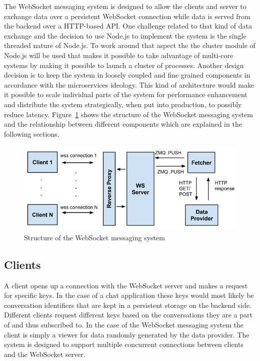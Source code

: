 The WebSocket messaging system is designed to allow the clients and server to exchange data over a persistent WebSocket connection while data is served from the backend over a HTTP-based API. One challenge related to that kind of data exchange and the decision to use Node.js to implement the system is the single threaded nature of Node.js. To work around that aspect the the cluster module of Node.js will be used that makes it possible to take advantage of multi-core systems by making it possible to launch a cluster of processes. Another design decision is to keep the system in loosely coupled and fine grained components in accordance with the microservices ideology. This kind of architecture would make it possible to scale individual parts of the system for performance enhancement and distribute the system strategically, when put into production, to possibly reduce latency. Figure~\ref{fig:webSocketMessagingSystem} shows the structure of the WebSocket messaging system and the relationship between different components which are explained in the following sections.
\\
\begin{figure}[h!]
	\centering
	\label{fig:webSocketMessagingSystem}\includegraphics[width=1\textwidth]{images/websocketMessagingSystem}
	\caption{Structure of the WebSocket messaging system}
\end{figure}

\subsection{Clients}

A client opens up a connection with the WebSocket server and makes a request for specific keys. In the case of a chat application these keys would most likely be conversation identifiers that are kept in a persistent storage on the backend side. Different clients request different keys based on the conversations they are a part of and thus subscribed to. In the case of the WebSocket messaging system the client is simply a viewer for data randomly generated by the data provider. The system is designed to support multiple concurrent connections between clients and the WebSocket server.

